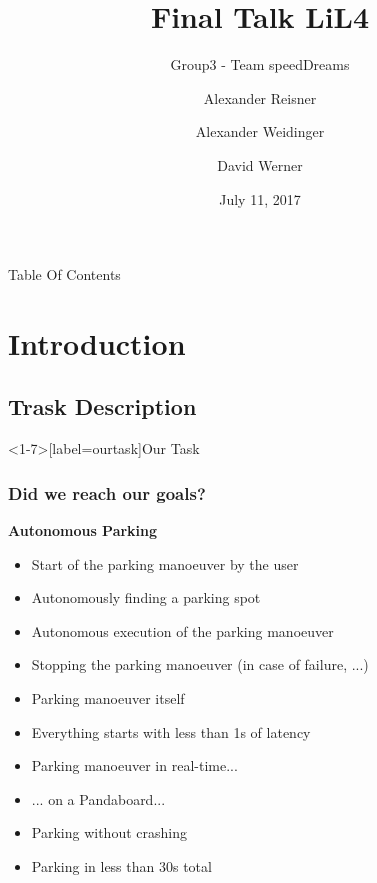 \documentclass[aspectratio=169]{beamer}
\title{Final Talk LiL4}
\subtitle{Group3 - Team speedDreams}
\date{July 11, 2017}
\author{Alexander Reisner \and
Alexander Weidinger \and
David Werner}
\institute{Technische Universität München}
\begin{document}
  \renewcommand{\figurename}{\tiny Fig.}
  \maketitle

\begin{frame}{Table Of Contents}
  \begin{multicols}{2}
  \tableofcontents
\end{multicols}
  \end{frame}

  \section{Introduction}

  \subsection{Trask Description}
  \begin{frame}<1-7>[label=ourtask]{Our Task}
    \frametitle<8>{Did we reach our goals?}
    \textbf{Autonomous Parking}
    \begin{itemize}
      \item<2-> Start of the parking manoeuver by the user 
      \item<2-> Autonomously finding a parking spot 
      \item<2-> Autonomous execution of the parking manoeuver 
      \item<2-> Stopping the parking manoeuver (in case of failure, ...) \uncover<8>{\ding{51}}
      \item<2-> Parking manoeuver itself 
    \end{itemize}
    \begin{itemize}
      \item<4-> Everything starts with less than 1s of latency 
      \item<4-> Parking manoeuver in real-time... 
      \item<5-> ... on a Pandaboard...  \uncover<8>{\ding{51}}
      \item<7-> Parking without crashing 
      \item<7-> Parking in less than 30s total 
    \end{itemize}
  \end{frame}
\end{document}
